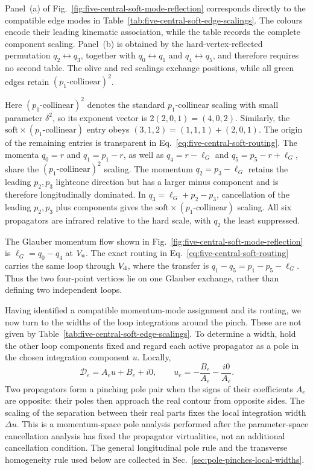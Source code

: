 \documentclass[a4paper,11pt]{article}
\begin{document}
Panel~(a) of Fig.~\ref{fig:five-central-soft-mode-reflection} corresponds
directly to the compatible edge modes in
Table~\ref{tab:five-central-soft-edge-scalings}.  The colours encode their
leading kinematic association, while the table records the complete
component scaling.  Panel~(b) is obtained by the hard-vertex-reflected
permutation \(q_2\leftrightarrow q_3\), together with
\(q_0\leftrightarrow q_1\) and \(q_4\leftrightarrow q_5\), and therefore
requires no second table.  The olive and red scalings exchange positions,
while all green edges retain \((p_1\text{-collinear})^2\).

Here \((p_1\text{-collinear})^2\) denotes the standard
\(p_1\)-collinear scaling with small parameter \(\delta^2\), so its exponent
vector is \(2(2,0,1)=(4,0,2)\).  Similarly, the
\(\text{soft}\times(p_1\text{-collinear})\) entry obeys
\((3,1,2)=(1,1,1)+(2,0,1)\).
The origin of the remaining entries is transparent in
Eq.~\eqref{eq:five-central-soft-routing}.  The momenta \(q_0=r\) and
\(q_1=p_1-r\), as well as \(q_4=r-\ell_G\) and
\(q_5=p_5-r+\ell_G\), share the
\((p_1\text{-collinear})^2\) scaling.  The momentum
\(q_2=p_3-\ell_G\) retains the leading \(p_2,p_3\) lightcone direction but
has a larger minus component and is therefore longitudinally dominated.
In \(q_3=\ell_G+p_2-p_3\), cancellation of the leading \(p_2,p_3\) plus
components gives the \(\text{soft}\times(p_1\text{-collinear})\) scaling.
All six propagators are infrared relative to the hard scale, with \(q_2\)
the least suppressed.

The Glauber momentum flow shown in Fig.~\ref{fig:five-central-soft-mode-reflection}
is \(\ell_G=q_0-q_4\) at \(V_{\rm u}\).  The exact routing in
Eq.~\eqref{eq:five-central-soft-routing} carries the same loop through
\(V_{\rm d}\), where the transfer is
\(q_1-q_5=p_1-p_5-\ell_G\).  Thus the two four-point vertices lie on one
Glauber exchange, rather than defining two independent loops.

Having identified a compatible momentum-mode assignment and its routing, we now turn
to the widths of the loop integrations around the pinch.  These are not
given by Table~\ref{tab:five-central-soft-edge-scalings}.  To determine a
width, hold the other loop components fixed
and regard each active propagator as a pole in the chosen integration
component \(u\).  Locally,
\[
 \mathcal D_e=A_eu+B_e+i0,
 \qquad
 u_e=-\frac{B_e}{A_e}-\frac{i0}{A_e}.
\]
Two propagators form a pinching pole pair when the signs of their coefficients
\(A_e\) are opposite: their poles then approach the real contour from
opposite sides.  The scaling of the separation between their real parts fixes
the local integration width \(\Delta u\).  This is a momentum-space pole
analysis performed after the parameter-space cancellation analysis has fixed
the propagator virtualities, not an additional cancellation condition.  The
general longitudinal pole rule and the transverse homogeneity rule used below
are collected in Sec.~\ref{sec:pole-pinches-local-widths}.
\end{document}
